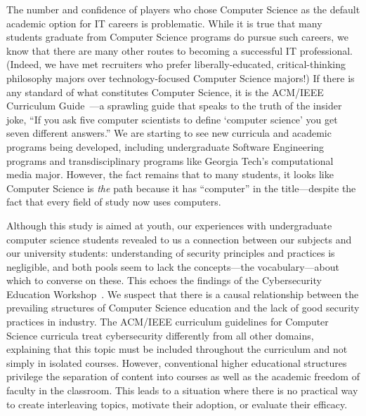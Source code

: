 \documentclass[letterpaper]{article}
\begin{document}
The number and confidence of players who chose Computer Science as the
default academic option for IT careers is problematic.  While it is
true that many students graduate from Computer Science programs do
pursue such careers, we know that there are many other routes to
becoming a successful IT professional.  (Indeed, we have met
recruiters who prefer liberally-educated, critical-thinking philosophy
majors over technology-focused Computer Science majors!)  If there is
any standard of what constitutes Computer Science, it is the ACM/IEEE
Curriculum Guide~\citep{CS2013}---a sprawling guide that speaks to the
truth of the insider joke, ``If you ask five computer scientists to
define `computer science' you get seven different answers.''  We are
starting to see new curricula and academic programs being developed,
including undergraduate Software Engineering programs and
transdisciplinary programs like Georgia Tech's computational media
major. However, the fact remains that to many students, 
it looks like Computer Science is \textit{the} path because it has
``computer'' in the title---despite the fact that every field of study
now uses computers.

Although this study is aimed at youth, our experiences with
undergraduate computer science students revealed to us a connection
between our subjects and our university students: 
understanding of security principles and practices is negligible, 
and both pools seem to lack the concepts---the vocabulary---about
which to converse on these. This echoes the findings of the 
Cybersecurity Education Workshop~\citep{Cybersecurity2014}.
We suspect that there is a causal relationship between the
prevailing structures of Computer Science education and the lack
of good security practices in industry. The ACM/IEEE curriculum
guidelines for Computer Science curricula treat cybersecurity differently
from all other domains, explaining that this topic must be included
throughout the curriculum and not simply in isolated courses.
However, conventional higher educational structures privilege the
separation of content into courses as well as the academic freedom
of faculty in the classroom. This leads to a situation where there is
no practical way to create interleaving topics, motivate their adoption,
or evaluate their efficacy. 
\end{document}
